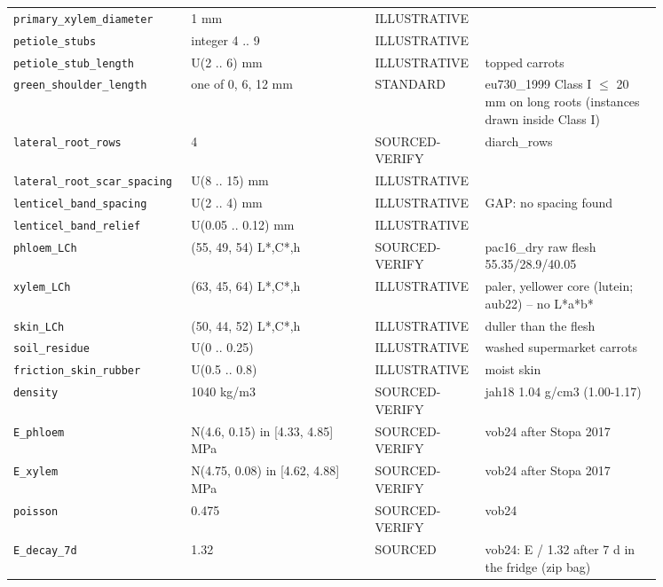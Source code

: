 \documentclass[10.5pt,a4paper]{article}
\begin{document}
{\begin{longtable}{@{}p{0.2\linewidth}p{0.27\linewidth}p{0.12\linewidth}p{0.26\linewidth}@{}}
\texttt{primary\_\allowbreak{}xylem\_\allowbreak{}diameter} & 1 mm & ILLUSTRATIVE &  \\
\texttt{petiole\_\allowbreak{}stubs} & integer 4 .. 9 & ILLUSTRATIVE &  \\
\texttt{petiole\_\allowbreak{}stub\_\allowbreak{}length} & U(2 .. 6) mm & ILLUSTRATIVE & topped carrots \\
\texttt{green\_\allowbreak{}shoulder\_\allowbreak{}length} & one of 0, 6, 12 mm & STANDARD & eu730\_1999 Class I $\le$ 20 mm on long roots (instances drawn inside Class I) \\
\texttt{lateral\_\allowbreak{}root\_\allowbreak{}rows} & 4 & SOURCED-VERIFY & diarch\_rows \\
\texttt{lateral\_\allowbreak{}root\_\allowbreak{}scar\_\allowbreak{}spacing} & U(8 .. 15) mm & ILLUSTRATIVE &  \\
\texttt{lenticel\_\allowbreak{}band\_\allowbreak{}spacing} & U(2 .. 4) mm & ILLUSTRATIVE & GAP: no spacing found \\
\texttt{lenticel\_\allowbreak{}band\_\allowbreak{}relief} & U(0.05 .. 0.12) mm & ILLUSTRATIVE &  \\
\texttt{phloem\_\allowbreak{}LCh} & (55, 49, 54) L*,C*,h & SOURCED-VERIFY & pac16\_dry raw flesh 55.35/28.9/40.05 \\
\texttt{xylem\_\allowbreak{}LCh} & (63, 45, 64) L*,C*,h & ILLUSTRATIVE & paler, yellower core (lutein; aub22) -- no L*a*b* \\
\texttt{skin\_\allowbreak{}LCh} & (50, 44, 52) L*,C*,h & ILLUSTRATIVE & duller than the flesh \\
\texttt{soil\_\allowbreak{}residue} & U(0 .. 0.25) & ILLUSTRATIVE & washed supermarket carrots \\
\texttt{friction\_\allowbreak{}skin\_\allowbreak{}rubber} & U(0.5 .. 0.8) & ILLUSTRATIVE & moist skin \\
\texttt{density} & 1040 kg/m3 & SOURCED-VERIFY & jah18 1.04 g/cm3 (1.00-1.17) \\
\texttt{E\_\allowbreak{}phloem} & N(4.6, 0.15) in [4.33, 4.85] MPa & SOURCED-VERIFY & vob24 after Stopa 2017 \\
\texttt{E\_\allowbreak{}xylem} & N(4.75, 0.08) in [4.62, 4.88] MPa & SOURCED-VERIFY & vob24 after Stopa 2017 \\
\texttt{poisson} & 0.475 & SOURCED-VERIFY & vob24 \\
\texttt{E\_\allowbreak{}decay\_\allowbreak{}7d} & 1.32 & SOURCED & vob24: E / 1.32 after 7 d in the fridge (zip bag) \\

\end{longtable}}
\end{document}
